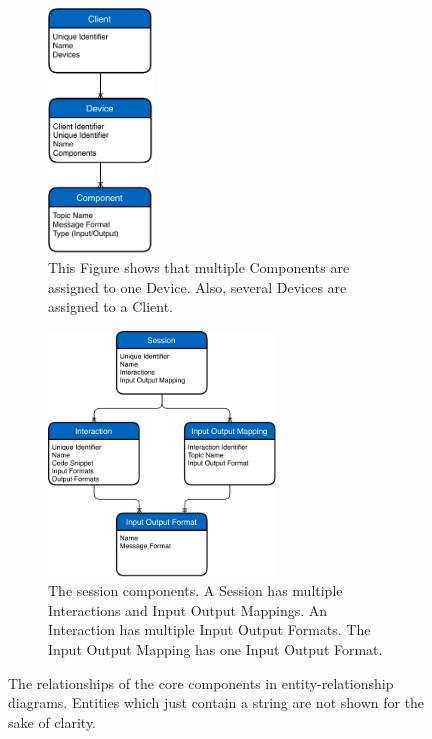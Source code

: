 \begin{figure}[H]
	\centering
	\begin{subfigure}[t]{.48\textwidth}
		\centering
		\includegraphics[height=6.5cm]{figures/implementation/ubii_er_client.pdf}
		\caption{This Figure shows that multiple Components are assigned to one Device. Also, several Devices are assigned to a Client.}\label{fig:ubii-er-client}
  \end{subfigure}%
  \hspace{0.04\textwidth}%
	\begin{subfigure}[t]{.48\textwidth}
		\centering
		\includegraphics[height=6.5cm]{figures/implementation/ubii_er_server.pdf}
		\caption{The session components. A Session has multiple Interactions and Input Output Mappings. An Interaction has multiple Input Output Formats. The Input Output Mapping has one Input Output Format.}\label{fig:ubii-er-server}
	\end{subfigure}
	\caption[UBII components diagram]{The relationships of the core components in entity-relationship diagrams. Entities which just contain a string are not shown for the sake of clarity.}\label{fig:ubii-er}
\end{figure}

